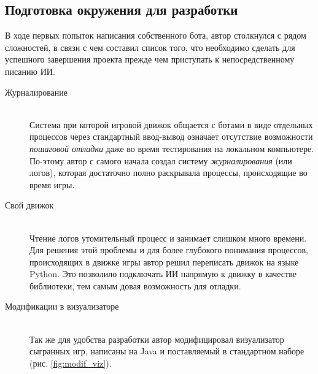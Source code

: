 \documentclass[12pt]{report}
\begin{document}
\subsection{Подготовка окружения для разработки}
В ходе первых попыток написания собственного бота, автор столкнулся с рядом сложностей, в связи с чем составил список того, что необходимо сделать для успешного завершения проекта прежде чем приступать к непосредственному писанию ИИ.
\begin{description}
\item[Журналирование] \hfill \\ Система при которой игровой движок общается с ботами в виде отдельных процессов через стандартный ввод-вывод означает отсутствие возможности \emph{пошаговой отладки} даже во время тестирования на локальном компьютере. По-этому автор с самого начала создал систему \emph{журналирования} (или логов), которая достаточно полно раскрывала процессы, происходящие во время игры.
\item[Свой движок] \hfill \\ Чтение логов утомительный процесс и занимает слишком много времени. Для решения этой проблемы и для более глубокого понимания процессов, происходящих в движке игры автор решил переписать движок на языке Python. Это позволило подключать ИИ напрямую к движку в качестве библиотеки, тем самым довая возможность для отладки.
\item[Модификации в визуализаторе] \hfill \\ Так же для удобства разработки автор модифицировал визуализатор сыгранных игр, написаны на Java и поставляемый в стандартном  наборе (рис. \ref{fig:modif_viz}). 


\end{description}
\end{document}
